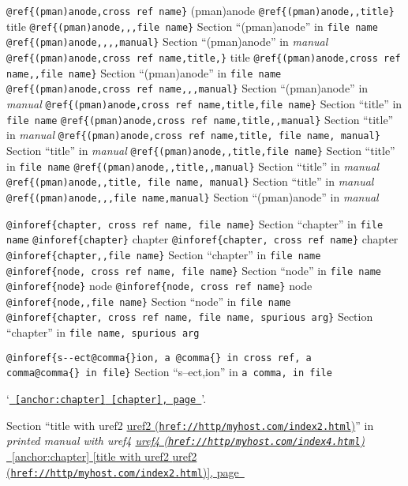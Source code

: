 \documentclass{book}
\renewcommand{\_}{\Texinfounderscore\discretionary{}{}{}}
\begin{document}
\begin{titlepage}
\texttt{@ref\{(pman)anode,cross ref name\}} (pman)anode
\texttt{@ref\{(pman)anode{,}{,}title\}} title
\texttt{@ref\{(pman)anode{,}{,},file name\}} Section ``(pman)anode'' in \texttt{file name}
\texttt{@ref\{(pman)anode{,}{,}{,}{,}manual\}} Section ``(pman)anode'' in \textsl{manual}
\texttt{@ref\{(pman)anode,cross ref name,title,\}} title
\texttt{@ref\{(pman)anode,cross ref name{,}{,}file name\}} Section ``(pman)anode'' in \texttt{file name}
\texttt{@ref\{(pman)anode,cross ref name{,}{,},manual\}} Section ``(pman)anode'' in \textsl{manual}
\texttt{@ref\{(pman)anode,cross ref name,title,file name\}} Section ``title'' in \texttt{file name}
\texttt{@ref\{(pman)anode,cross ref name,title{,}{,}manual\}} Section ``title'' in \textsl{manual}
\texttt{@ref\{(pman)anode,cross ref name,title,\ file name,\ manual\}} Section ``title'' in \textsl{manual}
\texttt{@ref\{(pman)anode{,}{,}title,file name\}} Section ``title'' in \texttt{file name}
\texttt{@ref\{(pman)anode{,}{,}title{,}{,}manual\}} Section ``title'' in \textsl{manual}
\texttt{@ref\{(pman)anode{,}{,}title,\ file name,\ manual\}} Section ``title'' in \textsl{manual}
\texttt{@ref\{(pman)anode{,}{,},file name,manual\}} Section ``(pman)anode'' in \textsl{manual}


\texttt{@inforef\{chapter,\ cross ref name,\ file name\}} Section ``chapter'' in \texttt{file name}
\texttt{@inforef\{chapter\}} chapter
\texttt{@inforef\{chapter,\ cross ref name\}} chapter
\texttt{@inforef\{chapter{,}{,}file name\}} Section ``chapter'' in \texttt{file name}
\texttt{@inforef\{node,\ cross ref name,\ file name\}} Section ``node'' in \texttt{file name}
\texttt{@inforef\{node\}} node
\texttt{@inforef\{node,\ cross ref name\}} node
\texttt{@inforef\{node{,}{,}file name\}} Section ``node'' in \texttt{file name}
\texttt{@inforef\{chapter,\ cross ref name,\ file name,\ spurious arg\}} Section ``chapter'' in \texttt{file name,\ spurious arg}

\texttt{@inforef\{s{-}{-}ect@comma\{\}ion,\ a @comma\{\}\ in cross
ref,\ a comma@comma\{\}\ in file\}}
Section ``s--ect,ion'' in \texttt{a comma,\ in file}

`\texttt{\hyperref[anchor:chapter]{\chaptername~\ref*{anchor:chapter} [chapter], page~\pageref*{anchor:chapter}}}'.

Section ``title with uref2 \href{href://http/myhost.com/index2.html}{uref2 (\nolinkurl{href://http/myhost.com/index2.html})}'' in \textsl{printed manual with uref4 \href{href://http/myhost.com/index4.html}{uref4 (\nolinkurl{href://http/myhost.com/index4.html})}}
\hyperref[anchor:chapter]{\chaptername~\ref*{anchor:chapter} [title with uref2 \href{href://http/myhost.com/index2.html}{uref2 (\nolinkurl{href://http/myhost.com/index2.html})}], page~\pageref*{anchor:chapter}}


\end{titlepage}
\end{document}
